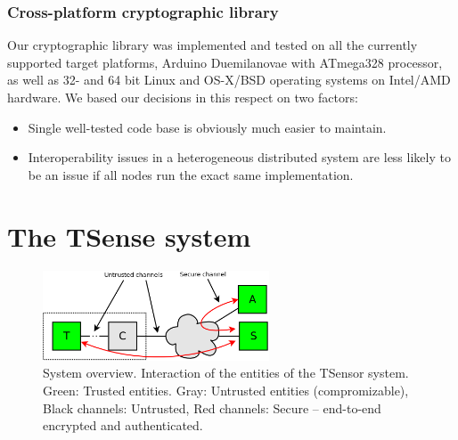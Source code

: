 \subsubsection{Cross-platform cryptographic library}

Our cryptographic library was implemented and tested on all the currently supported target platforms, Arduino Duemilanovae with ATmega328 processor, as well as 32- and 64 bit Linux and OS-X/BSD operating systems on Intel/AMD hardware. We based our decisions in this respect on two factors:
\begin{itemize}
\item Single well-tested code base is obviously much easier to maintain.
\item Interoperability issues in a heterogeneous distributed system are less likely to be an issue if all nodes run the exact same implementation.
\end{itemize}

\section{The TSense system}
\label{sec:tsense-system-overview}

\begin{figure}
\begin{center}
\includegraphics[width=0.6\textwidth]{figures/sys-overview.png} 
\end{center}
\caption{System overview. Interaction of the entities of the TSensor system. Green: Trusted entities. Gray: Untrusted entities (compromizable), Black channels: Untrusted, Red channels: Secure -- end-to-end encrypted and authenticated.}
\label{fig:sys-overview}
\end{figure}

